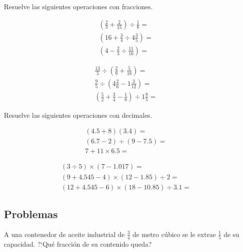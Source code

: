 \documentclass[11pt]{article}
\begin{document}
\vspace{5mm}

Resuelve las siguientes operaciones con fracciones.
\begin{multicols}{2}
\begin{align}
\left(  \frac{2}{3} + \frac{2}{15} \right) \div \frac{1}{6} = \\
\left( 16 + \frac{3}{4} \div 4\frac{3}{5} \right) = \\
\left( 4 - \frac{2}{3} \div \frac{11}{16} \right) = 
\end{align}

\begin{align}
\frac{13}{5} \div \left( \frac{2}{9} + \frac{5}{18} \right) =\\
\frac{9}{5} \div \left( 4\frac{2}{6} - 1\frac{3}{12} \right) = \\
\left( \frac{5}{2} + \frac{3}{4} - \frac{1}{8} \right) \div 1\frac{8}{5} = 
\end{align}
\end{multicols}

\vspace{0.5cm}

Resuelve las siguientes operaciones con decimales.

\begin{multicols}{2}
\begin{align}
(4.5 + 8)(3.4) = \\
(6.7 - 2) \div (9 - 7.5) = \\
7 + 11 \times 6.5 = 
\end{align}

\begin{align}
(3 \div 5) \times (7 - 1.017) = \\
(9 + 4.545 - 4) \times (12 - 1.85) \div 2 = \\
(12 + 4.545 - 6) \times (18 - 10.85) \div 3.1 = 
\end{align}
\end{multicols}

\newpage

\subsection{Problemas}

A una contenedor de aceite industrial de $\frac{3}{4}$ de metro c\'ubico se le
extrae $\frac{1}{5}$ de su capacidad. ?`Qu\'e fracci\'on de su contenido queda?

\vspace{1cm}
\end{document}
